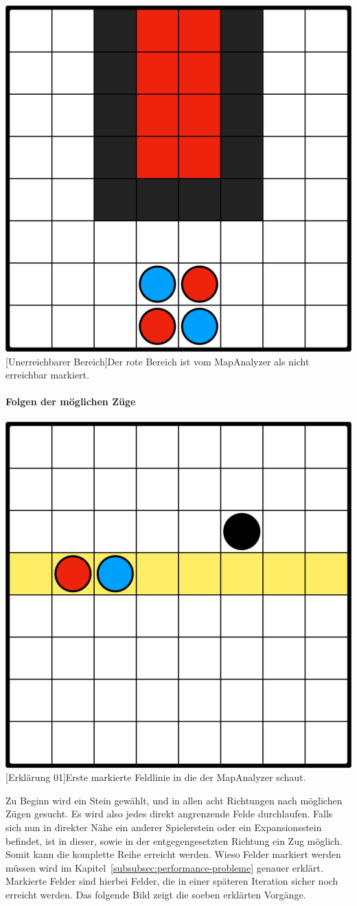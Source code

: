 \vspace{1em}
\begin{minipage}{\linewidth}
    \centering
    \includegraphics[width=0.45\linewidth]{pics/not-reachable}
    [Unerreichbarer Bereich]{Der rote Bereich ist vom MapAnalyzer als nicht erreichbar markiert.}
    \label{fig:unreachable}
\end{minipage}
\vspace{0.5em}

\paragraph{Folgen der m\"oglichen Z\"uge}\label{paragraph:folgen-von-zuegen}
\vspace{1em}
\begin{minipage}{\linewidth}
    \centering
    \includegraphics[width=0.45\linewidth]{pics/explaination/explaination-01}
    [Erkl\"arung 01]{Erste markierte Feldlinie in die der MapAnalyzer schaut.}
    \label{fig:explaination-01}
\end{minipage}
\vspace{0.5em}

Zu Beginn wird ein Stein gew\"ahlt, und in allen acht Richtungen nach m\"oglichen Z\"ugen gesucht.
Es wird also jedes direkt angrenzende Felde durchlaufen.
Falls sich nun in direkter N\"ahe ein anderer Spielerstein oder ein Expansionsstein befindet, ist in dieser, sowie in der entgegengesetzten Richtung ein Zug m\"oglich.
Somit kann die komplette Reihe erreicht werden.
Wieso Felder markiert werden m\"ussen wird im Kapitel~\ref{subsubsec:performance-probleme} genauer erkl\"art.
Markierte Felder sind hierbei Felder, die in einer sp\"ateren Iteration sicher noch erreicht werden.
Das folgende Bild zeigt die soeben erkl\"arten Vorg\"ange.

